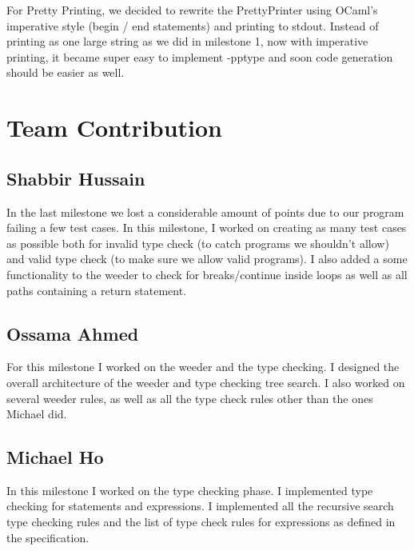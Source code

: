 \documentclass{article}
\begin{document}
For Pretty Printing, we decided to rewrite the PrettyPrinter using OCaml's imperative style (begin / end statements) and printing to stdout. Instead of printing as one large string as we did in milestone 1, now with imperative printing, it became super easy to implement -pptype and soon code generation should be easier as well.


\section{Team Contribution}

\subsection{Shabbir Hussain}
In the last milestone we lost a considerable amount of points due to our program failing a few test cases. In this milestone, I worked on creating as many test cases as possible both for invalid type check (to catch programs we shouldn't allow) and valid type check  (to make sure we allow valid programs). I also added a some functionality to the weeder to check for breaks/continue inside loops as well as all paths containing a return statement.

\subsection{Ossama Ahmed}
For this milestone I worked on the weeder and the type checking. I designed the overall architecture of the weeder and type checking tree search. I also worked on several weeder rules, as well as all the type check rules other than the ones Michael did. 

\subsection{Michael Ho}
In this milestone I worked on the type checking phase. I implemented type checking for statements and expressions. I implemented all the recursive search type checking rules and the list of type check rules for expressions as defined in the specification. 


\end{document}
